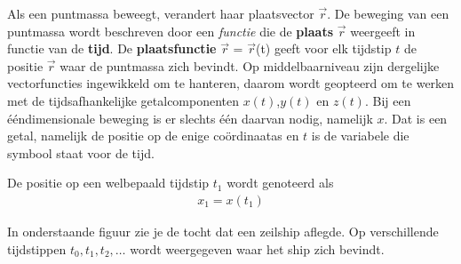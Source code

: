 \documentclass{ximera}
\renewcommand{\includegraphics}[2][]{%
    \HCode{<img src="#2" alt=""/>}%
  }
\begin{document}
Als een puntmassa beweegt, verandert haar plaatsvector \(\vec{r}\).  
De beweging van een puntmassa wordt beschreven door een \textit{functie} die de \textbf{plaats} \(\vec{r}\) weergeeft in functie van de \textbf{tijd}. 
De \textbf{plaatsfunctie} \(\vec{r}\) = \(\vec{r}\)(t) geeft voor elk tijdstip \(t\) de positie \(\vec{r}\) waar de puntmassa zich bevindt. 
Op middelbaarniveau zijn dergelijke vectorfuncties ingewikkeld om te hanteren, daarom wordt geopteerd om te werken met de tijdsafhankelijke getalcomponenten \(x(t)\),\(y(t)\) en \(z(t)\).
Bij een ééndimensionale beweging is er slechts één daarvan nodig, namelijk \(x\). Dat is een getal, namelijk de positie op de enige coördinaatas
en $t$ is de variabele die symbool staat voor de tijd.


De positie op een welbepaald tijdstip $t_1$ wordt genoteerd als 
\begin{eqnarray*}
x_1=x(t_1)
\end{eqnarray*}

In onderstaande figuur zie je de tocht dat een zeilship aflegde. 
Op verschillende tijdstippen $t_0,t_1, t_2,\ldots$ wordt weergegeven waar het ship zich bevindt. 




\end{document}
